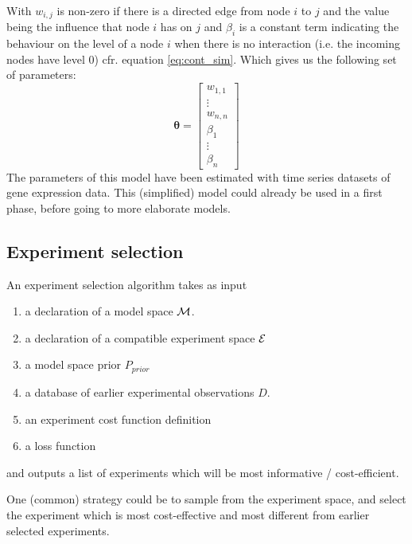 \documentclass{article}
\begin{document}
With $w_{i,j}$ is non-zero if there is a directed edge from node $i$ to $j$ and the value being the influence that node $i$ has on $j$ and $\beta_i$ is a constant term indicating the behaviour on the level of a node $i$ 
when there is no interaction (i.e. the incoming nodes have level 0) cfr. equation \ref{eq:cont_sim}. Which gives us the following set of parameters:
\begin{equation}
 \mathbf{\theta} = \begin{bmatrix}
                     w_{1,1} \\
                     \vdots \\
                     w_{n,n} \\
                     \beta_1 \\
                     \vdots \\
                     \beta_n
                    \end{bmatrix}
% 
\end{equation}
The parameters of this model have been estimated with time series datasets of gene expression data. This (simplified) model could already be used in a first phase, before going to more elaborate models.

\subsection{Experiment selection}

An experiment selection algorithm takes as input

\begin{enumerate}
\item a declaration of a model space $\mathcal{M}$.
\item a declaration of a compatible experiment space $\mathcal{E}$
\item a model space prior $P_{prior}$
\item a database of earlier experimental observations $D$.
\item an experiment cost function definition
\item a loss function
\end{enumerate}

and outputs a list of experiments which will be most informative / cost-efficient.

One (common) strategy could be to sample from the experiment space, and select the experiment which is most cost-effective and most different from earlier selected experiments.
\end{document}
